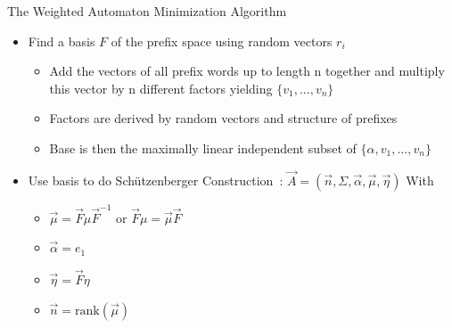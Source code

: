 \documentclass[rgb, pdf]{beamer}
\begin{document}
\begin{frame}[allowframebreaks]{The Weighted Automaton Minimization Algorithm~\autocite{Kiefer2013OnTC}}
        \begin{itemize}
         \item Find a basis $F$ of the prefix space using random vectors $r_i$
         \begin{itemize}
          \item Add the vectors of all prefix words up to length n together and multiply this vector by n different factors yielding $\{v_1, \dots, v_n\}$
          \item Factors are derived by random vectors and structure of prefixes
          \item Base is then the maximally linear independent subset of $\{ \alpha, v_1, \dots, v_n\}$
         \end{itemize}
         \vspace{0.5cm}
         \item Use basis to do Schützenberger Construction~\autocite{schutz}: $\overrightarrow{A} = (\overrightarrow{n}, \Sigma, \overrightarrow{\alpha}, \overrightarrow{\mu}, \overrightarrow{\eta})$
            With
            \begin{itemize}
             \item $\overrightarrow{\mu} = \overrightarrow{F} \mu \overrightarrow{F}^{-1}$ or $\overrightarrow{F} \mu = \overrightarrow{\mu} \overrightarrow{F}$
             \item $\overrightarrow{\alpha} = e_1$
             \item $\overrightarrow{\eta} = \overrightarrow{F}\eta$
             \item $\overrightarrow{n} = \text{rank}(\overrightarrow{\mu})$
            \end{itemize}

        \end{itemize}
    \end{frame}
\end{document}
